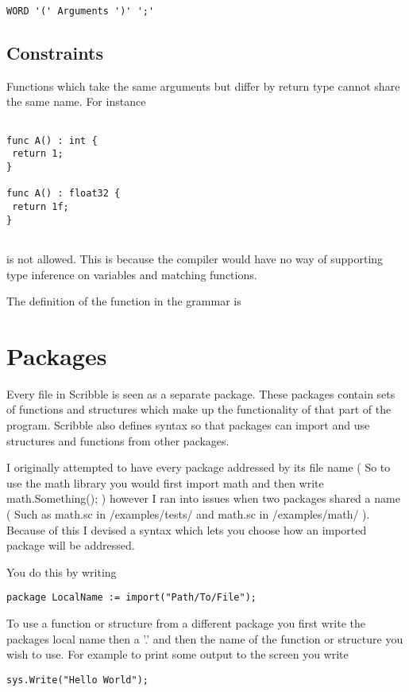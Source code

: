 \documentclass[]{final_report}
\begin{document}
\begin{verbatim}
WORD '(' Arguments ')' ';'
\end{verbatim}

\subsection{Constraints}

Functions which take the same arguments but differ by return type cannot share the same name. For instance

\begin{verbatim}

func A() : int {
 return 1;
}

func A() : float32 {
 return 1f;
}
 
\end{verbatim}

is not allowed. This is because the compiler would have no way of supporting type inference on variables and matching functions.

The definition of the function in the grammar is

\section{Packages}

Every file in Scribble is seen as a separate package. These packages contain sets of functions and structures which make up the functionality of that part of the program. Scribble also defines syntax so that packages can import and use structures and functions from other packages.

I originally attempted to have every package addressed by its file name ( So to use the math library you would first import math and then write math.Something();  ) however I ran into issues when two packages shared a name ( Such as math.sc in /examples/tests/ and math.sc in /examples/math/ ). Because of this I devised a syntax which lets you choose how an imported package will be addressed. 

You do this by writing
\begin{verbatim}
package LocalName := import("Path/To/File");
\end{verbatim}

To use a function or structure from a different package you first write the packages local name then a '.' and then the name of the function or structure you wish to use. For example to print some output to the screen you write 
\begin{verbatim}sys.Write("Hello World");\end{verbatim}
\end{document}
